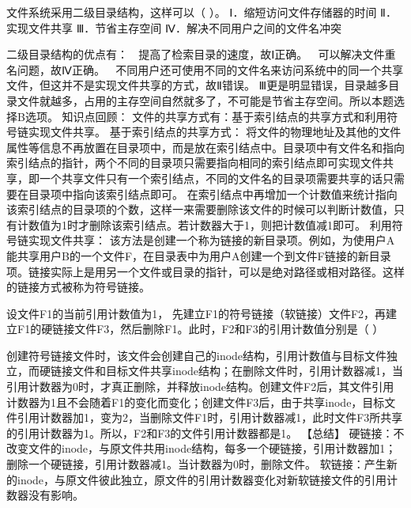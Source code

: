 \question 文件系统采用二级目录结构，这样可以（ ）。 Ⅰ．缩短访问文件存储器的时间
Ⅱ．实现文件共享 Ⅲ．节省主存空间 Ⅳ．解决不同用户之间的文件名冲突
\par{}
\begin{solution}二级目录结构的优点有：  提高了检索目录的速度，故Ⅰ正确。 
可以解决文件重名问题，故Ⅳ正确。 
不同用户还可使用不同的文件名来访问系统中的同一个共享文件，但这并不是实现文件共享的方式，故Ⅱ错误。
Ⅲ更是明显错误，目录越多目录文件就越多，占用的主存空间自然就多了，不可能是节省主存空间。所以本题选择B选项。
知识点回顾：
文件的共享方式有：基于索引结点的共享方式和利用符号链实现文件共享。
基于索引结点的共享方式：
将文件的物理地址及其他的文件属性等信息不再放置在目录项中，而是放在索引结点中。目录项中有文件名和指向索引结点的指针，两个不同的目录项只需要指向相同的索引结点即可实现文件共享，即一个共享文件只有一个索引结点，不同的文件名的目录项需要共享的话只需要在目录项中指向该索引结点即可。
在索引结点中再增加一个计数值来统计指向该索引结点的目录项的个数，这样一来需要删除该文件的时候可以判断计数值，只有计数值为1时才删除该索引结点。若计数器大于1，则把计数值减1即可。
利用符号链实现文件共享：
该方法是创建一个称为链接的新目录项。例如，为使用户A能共享用户B的一个文件F，在目录表中为用户A创建一个到文件F链接的新目录项。链接实际上是用另一个文件或目录的指针，可以是绝对路径或相对路径。这样的链接方式被称为符号链接。
\end{solution}
\question 设文件F1的当前引用计数值为1，
先建立F1的符号链接（软链接）文件F2，再建立F1的硬链接文件F3，然后删除F1。此时，F2和F3的引用计数值分别是（
）
\par{}
\begin{solution}创建符号链接文件时，该文件会创建自己的inode结构，引用计数值与目标文件独立，而硬链接文件和目标文件共享inode结构；在删除文件时，引用计数器减1，当引用计数器为0时，才真正删除，并释放inode结构。创建文件F2后，其文件引用计数器为1且不会随着F1的变化而变化；创建文件F3后，由于共享inode，目标文件引用计数器加1，变为2，当删除文件F1时，引用计数器减1，此时文件F3所共享的引用计数器为1。所以，F2和F3的文件引用计数器都是1。
【总结】
硬链接：不改变文件的inode，与原文件共用inode结构，每多一个硬链接，引用计数器加1；删除一个硬链接，引用计数器减1。当计数器为0时，删除文件。
软链接：产生新的inode，与原文件彼此独立，原文件的引用计数器变化对新软链接文件的引用计数器没有影响。
\end{solution}
